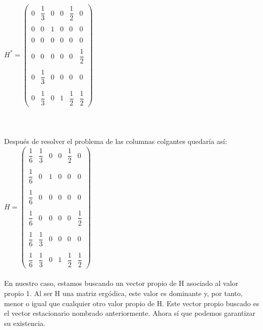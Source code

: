 \documentclass[a4paper]{article}
\begin{document}
\hspace{5cm}$H^*=\begin{pmatrix}
   0 & \dfrac{1}{3} & 0 & 0 & \dfrac{1}{2} & 0\\\\
   0 & 0 & 1 & 0 & 0 & 0\\\\
   0 & 0 & 0 & 0 & 0 & 0\\\\
   0 & 0 & 0 & 0 & 0 & \dfrac{1}{2}\\\\
   0 & \dfrac{1}{3} & 0 & 0 & 0 & 0\\\\
   0 & \dfrac{1}{3} & 0 & 1 & \dfrac{1}{2} & \dfrac{1}{2}
\end{pmatrix}$\\
\\
\\
\\


Después de resolver el problema de las columnas colgantes quedaría así:\\

\hspace{5cm}$H=\begin{pmatrix}
   \dfrac{1}{6} & \dfrac{1}{3} & 0 & 0 & \dfrac{1}{2} & 0\\ \\
   \dfrac{1}{6} & 0 & 1 & 0 & 0 & 0\\ \\
   \dfrac{1}{6} & 0 & 0 & 0 & 0 & 0\\\\
   \dfrac{1}{6} & 0 & 0 & 0 & 0 & \dfrac{1}{2}\\\\
   \dfrac{1}{6} & \dfrac{1}{3} & 0 & 0 & 0 & 0\\\\
   \dfrac{1}{6} & \dfrac{1}{3} & 0 & 1 & \dfrac{1}{2} & \dfrac{1}{2}
\end{pmatrix}$\\
\\

En nuestro caso, estamos buscando un vector propio de H asociado al valor propio 1. Al ser H una matriz ergódica,  este valor es dominante y, por tanto, menor o igual que cualquier otro valor propio de H. Este vector propio buscado es el vector estacionario nombrado anteriormente. Ahora sí que podemos garantizar su existencia.\\
\end{document}
